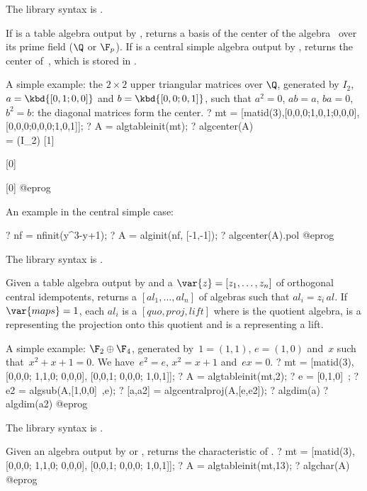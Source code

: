 The library syntax is .

\label{se:algcenter}
If  is a table algebra output by , returns a
basis of the center of the algebra~ over its prime field ($\Q$ or
$\F_p$). If  is a central simple algebra output by ,
returns the center of~, which is stored in .

A simple example: the $2\times 2$ upper triangular matrices over $\Q$,
generated by $I_2$, $a = \kbd{[0,1;0,0]}$ and $b = \kbd{[0,0;0,1]}$,
such that $a^2 = 0$, $ab = a$, $ba = 0$, $b^2 = b$: the diagonal matrices
form the center.
\bprog
? mt = [matid(3),[0,0,0;1,0,1;0,0,0],[0,0,0;0,0,0;1,0,1]];
? A = algtableinit(mt);
? algcenter(A) \\ = (I_2)
[1]

[0]

[0]
@eprog

An example in the central simple case:

\bprog
? nf = nfinit(y^3-y+1);
? A = alginit(nf, [-1,-1]);
? algcenter(A).pol
@eprog

The library syntax is .

\label{se:algcentralproj}
Given a table algebra  output by  and a
 $\var{z}=[z_1,\dots,z_n]$ of orthogonal central idempotents,
returns a  $[al_1,\dots,al_n]$ of algebras such that
$al_i = z_i\, al$. If $\var{maps}=1$, each $al_i$ is a 
$[quo,proj,lift]$ where  is the quotient algebra,  is a
 representing the projection onto this quotient and  is a
 representing a lift.

A simple example: $\F_2\oplus \F_4$, generated by~$1=(1,1)$, $e=(1,0)$
and~$x$ such that~$x^2+x+1=0$. We have~$e^2=e$, $x^2=x+1$ and~$ex=0$.
\bprog
? mt = [matid(3), [0,0,0; 1,1,0; 0,0,0], [0,0,1; 0,0,0; 1,0,1]];
? A = algtableinit(mt,2);
? e = [0,1,0]~;
? e2 = algsub(A,[1,0,0]~,e);
? [a,a2] = algcentralproj(A,[e,e2]);
? algdim(a)
? algdim(a2)
@eprog

The library syntax is .

\label{se:algchar}
Given an algebra  output by  or ,
returns the characteristic of .
\bprog
? mt = [matid(3), [0,0,0; 1,1,0; 0,0,0], [0,0,1; 0,0,0; 1,0,1]];
? A = algtableinit(mt,13);
? algchar(A)
@eprog

